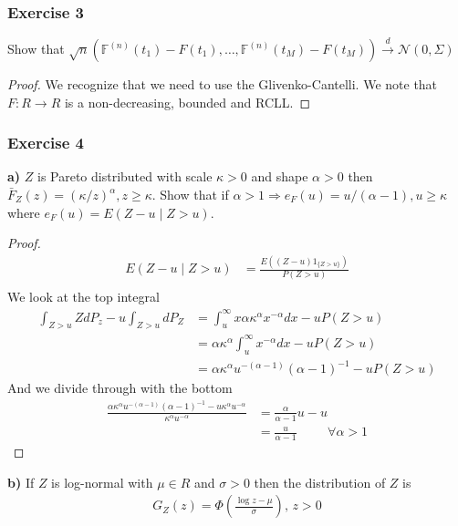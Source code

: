 \documentclass{article}
\begin{document}
\subsubsection{Exercise 3}
Show that $\sqrt{n}(\mathbb{F}^{(n)}(t_1) - F(t_1), \dots, \mathbb{F}^{(n)}(t_M) - F(t_M)) \overset{d}{\rightarrow} \mathcal{N}(0, \Sigma) $
\begin{proof}
We recognize that we need to use the Glivenko-Cantelli. We note that $F: R \rightarrow R$ is a non-decreasing, bounded and RCLL.


\end{proof}


\subsubsection{Exercise 4}
\textbf{a)}
$Z$ is Pareto distributed with scale $\kappa > 0$ and shape $\alpha > 0 $ then $\bar{F}_Z(z) = (\kappa / z )^{\alpha}, z \geq \kappa$.
Show that if $\alpha > 1 \Rightarrow e_F(u) = u / (\alpha -1), u \geq \kappa$ where $e_F(u) = E(Z-u \mid Z  > u)$. 
\begin{proof}
\begin{align*}
    E(Z-u \mid Z > u) &= \frac{E((Z-u)1_{\{ Z > u \}})}{P(Z > u)}\\
\end{align*}
We look at the top integral
\begin{align*}
    \int_{Z > u} Z dP_z - u \int_{Z>u}dP_Z &= \int_u^\infty x \alpha \kappa^\alpha x^{-\alpha} dx - uP(Z > u) \\
    &= \alpha \kappa^\alpha \int_u^\infty x^{-\alpha} dx -u P(Z>u)\\
    &= \alpha \kappa^\alpha u^{-(\alpha -1)}(\alpha -1)^{-1} - u P(Z>u) 
\end{align*}
And we divide through with the bottom
\begin{align*}
   \frac{\alpha \kappa^\alpha u^{-(\alpha -1)}(\alpha -1)^{-1} - u \kappa^\alpha  u^{-\alpha}}{\kappa^\alpha  u^{-\alpha}} 
   &= \frac{\alpha}{\alpha - 1}u - u \\
   &= \frac{u}{\alpha - 1} \hspace{1cm} \forall \alpha > 1
\end{align*}
\end{proof}
\textbf{b)}
If $Z$ is log-normal with $\mu \in R$ and $\sigma > 0$ then the distribution of $Z$ is 
\begin{align*}
    G_Z(z) = \Phi\left( \frac{\log z - \mu}{\sigma} \right), \, z > 0
\end{align*}
\end{document}
